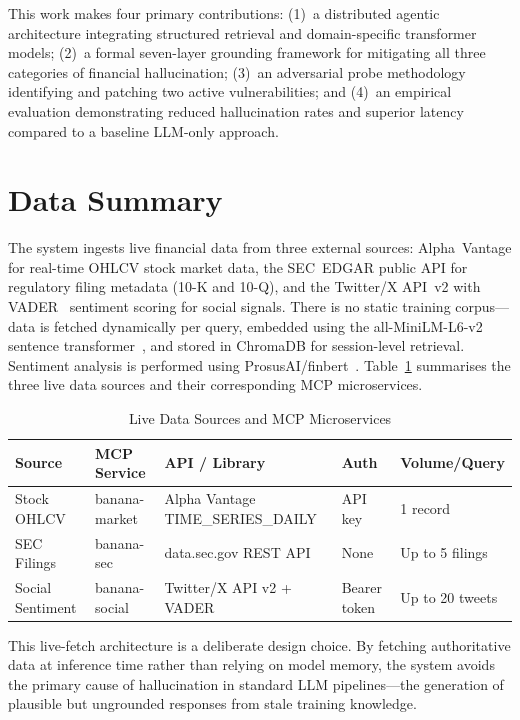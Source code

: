\documentclass[10pt,twocolumn]{article}
\begin{document}
This work makes four primary contributions:
(1)~a distributed agentic architecture integrating structured retrieval
and domain-specific transformer models;
(2)~a formal seven-layer grounding framework for mitigating all three
categories of financial hallucination;
(3)~an adversarial probe methodology identifying and patching two active
vulnerabilities; and
(4)~an empirical evaluation demonstrating reduced hallucination rates
and superior latency compared to a baseline LLM-only approach.

\section{Data Summary}
\label{sec:data}

The system ingests live financial data from three external sources:
Alpha~Vantage for real-time OHLCV stock market data, the SEC~EDGAR
public API for regulatory filing metadata (10-K and 10-Q), and the
Twitter/X API~v2 with VADER~\cite{hutto2014vader} sentiment scoring
for social signals.
There is no static training corpus---data is fetched dynamically per
query, embedded using the all-MiniLM-L6-v2 sentence
transformer~\cite{wang2020minilm}, and stored in ChromaDB for
session-level retrieval.
Sentiment analysis is performed using
ProsusAI/finbert~\cite{yang2020finbert}.
Table~\ref{tab:sources} summarises the three live data sources and
their corresponding MCP microservices.

\begin{table}[htbp]
\caption{Live Data Sources and MCP Microservices}
\label{tab:sources}
\centering
\small
\begin{tabular}{@{}p{2cm} p{2.8cm} p{4.5cm} p{1.8cm} p{2cm}@{}}
\toprule
\textbf{Source} & \textbf{MCP Service} & \textbf{API / Library} &
\textbf{Auth} & \textbf{Volume/Query} \\
\midrule
Stock OHLCV     & banana-market  & Alpha Vantage TIME\_SERIES\_DAILY & API key      & 1 record \\
SEC Filings     & banana-sec     & data.sec.gov REST API              & None         & Up to 5 filings \\
Social Sentiment& banana-social  & Twitter/X API v2 + VADER           & Bearer token & Up to 20 tweets \\
\bottomrule
\end{tabular}
\end{table}

This live-fetch architecture is a deliberate design choice.
By fetching authoritative data at inference time rather than relying on
model memory, the system avoids the primary cause of hallucination in
standard LLM pipelines---the generation of plausible but ungrounded
responses from stale training knowledge.
\end{document}
